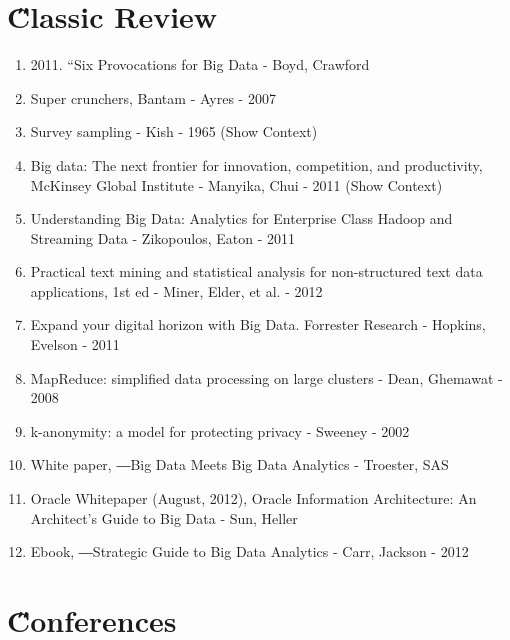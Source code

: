 \documentclass[a4paper,12pt,oneside]{book}
\begin{document}
\section{\H Classic Review}
\begin{enumerate}
\item 2011. “Six Provocations for Big Data - Boyd, Crawford 
\item Super crunchers, Bantam - Ayres - 2007
\item Survey sampling - Kish - 1965 (Show Context)
\item Big data: The next frontier for innovation, competition, and productivity, McKinsey Global Institute - Manyika, Chui - 2011 (Show Context)
\item Understanding Big Data: Analytics for Enterprise Class Hadoop and Streaming Data - Zikopoulos, Eaton - 2011
\item Practical text mining and statistical analysis for non-structured text data applications, 1st ed - Miner, Elder, et al. - 2012
\item Expand your digital horizon with Big Data. Forrester Research - Hopkins, Evelson - 2011 
\item MapReduce: simplified data processing on large clusters - Dean, Ghemawat - 2008 
\item k-anonymity: a model for protecting privacy - Sweeney - 2002
\item White paper, ―Big Data Meets Big Data Analytics - Troester, SAS
\item Oracle Whitepaper (August, 2012), Oracle Information Architecture: An Architect’s Guide to Big Data - Sun, Heller 
\item Ebook, ―Strategic Guide to Big Data Analytics - Carr, Jackson - 2012
\end{enumerate}




\section{\H Conferences}




\end{document}

